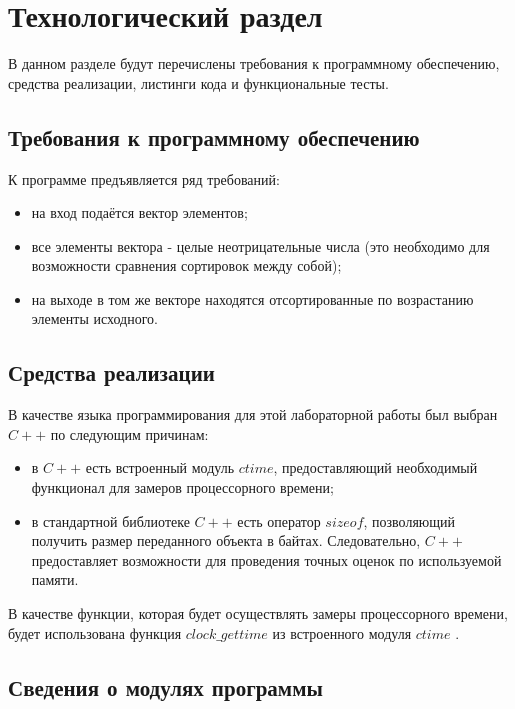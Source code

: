 \chapter{Технологический раздел}

В данном разделе будут перечислены требования к программному обеспечению, средства реализации, листинги кода и функциональные тесты.

\section{Требования к программному обеспечению}

К программе предъявляется ряд требований:

\begin{itemize} [label=--]
	\item на вход подаётся вектор элементов;
	\item все элементы вектора - целые неотрицательные числа (это необходимо для возможности сравнения сортировок между собой);
	\item на выходе в том же векторе находятся отсортированные по возрастанию элементы исходного.
\end{itemize}

\section{Средства реализации}

В качестве языка программирования для этой лабораторной работы был выбран $C++$ \cite{pl} по следующим причинам:

\begin{itemize}[label=--]
	\item в $C++$ есть встроенный модуль $ctime$, предоставляющий необходимый функционал для замеров процессорного времени;
	\item в стандартной библиотеке $C++$ есть оператор $sizeof$, позволяющий получить размер переданного объекта в байтах. Следовательно, $C++$ предоставляет возможности для проведения точных оценок по используемой памяти.
\end{itemize}

В качестве функции, которая будет осуществлять замеры процессорного времени, будет использована функция $clock\_gettime$ из встроенного модуля $ctime$ \cite{cpu_time_func}.

\section{Сведения о модулях программы}

